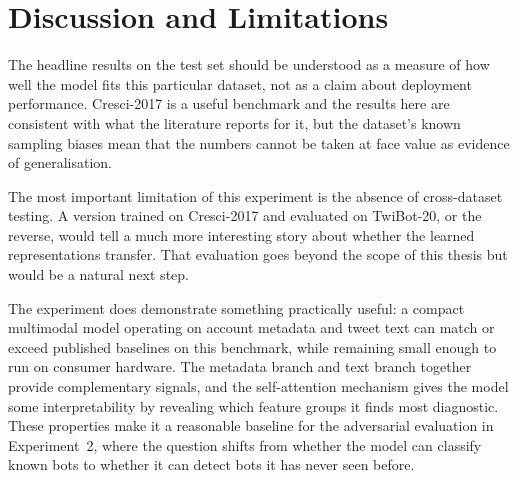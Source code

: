 \section{Discussion and Limitations}
\label{sec:discussion1}

The headline results on the test set should be understood as a measure of
how well the model fits this particular dataset, not as a claim about
deployment performance. Cresci-2017 is a useful benchmark and the results
here are consistent with what the literature reports for it, but the
dataset's known sampling biases mean that the numbers cannot be taken at
face value as evidence of generalisation.

The most important limitation of this experiment is the absence of
cross-dataset testing. A version trained on Cresci-2017 and evaluated on
TwiBot-20, or the reverse, would tell a much more interesting story about
whether the learned representations transfer. That evaluation goes beyond
the scope of this thesis but would be a natural next step.

The experiment does demonstrate something practically useful: a compact
multimodal model operating on account metadata and tweet text can match or
exceed published baselines on this benchmark, while remaining small enough
to run on consumer hardware. The metadata branch and text branch together
provide complementary signals, and the self-attention mechanism gives the
model some interpretability by revealing which feature groups it finds most
diagnostic. These properties make it a reasonable baseline for the
adversarial evaluation in Experiment~2, where the question shifts from
whether the model can classify known bots to whether it can detect bots it
has never seen before.
